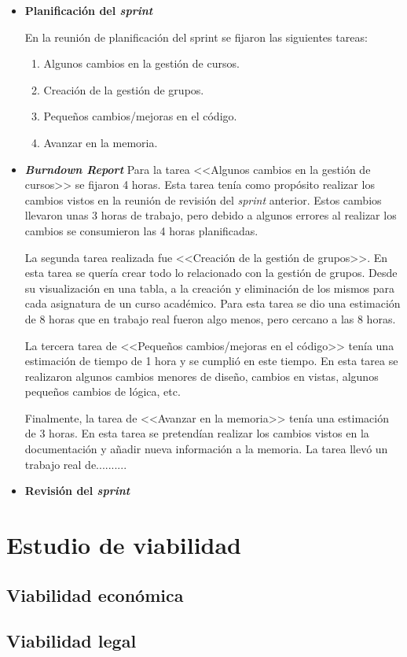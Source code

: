 \begin{itemize}
\item\textbf{Planificación del \textit{sprint}}


En la reunión de planificación del sprint se fijaron las siguientes tareas:
\begin{enumerate}
		\item Algunos cambios en la gestión de cursos.
		\item Creación de la gestión de grupos.
		\item Pequeños cambios/mejoras en el código.
		\item Avanzar en la memoria.
\end{enumerate}

\item\textbf{\textit{Burndown Report}}
Para la tarea <<Algunos cambios en la gestión de cursos>> se fijaron 4 horas. 
Esta tarea tenía como propósito realizar los cambios vistos en la reunión de revisión del \textit{sprint} anterior.
Estos cambios llevaron unas 3 horas de trabajo, pero debido a algunos errores al realizar los cambios se consumieron las 4 horas planificadas.

La segunda tarea realizada fue <<Creación de la gestión de grupos>>.
En esta tarea se quería crear todo lo relacionado con la gestión de grupos.
Desde su visualización en una tabla, a la creación y eliminación de los mismos para cada asignatura de un curso académico.
Para esta tarea se dio una estimación de 8 horas que en trabajo real fueron algo menos, pero cercano a las 8 horas.

La tercera tarea de <<Pequeños cambios/mejoras en el código>> tenía una estimación de tiempo de 1 hora y se cumplió en este tiempo.
En esta tarea se realizaron algunos cambios menores de diseño, cambios en vistas, algunos pequeños cambios de lógica, etc.

Finalmente, la tarea de <<Avanzar en la memoria>> tenía una estimación de 3 horas.
En esta tarea se pretendían realizar los cambios vistos en la documentación y añadir nueva información a la memoria.
La tarea llevó un trabajo real de..........

\item\textbf{Revisión del \textit{sprint}}

\end{itemize}



\section{Estudio de viabilidad}

\subsection{Viabilidad económica}

\subsection{Viabilidad legal}


